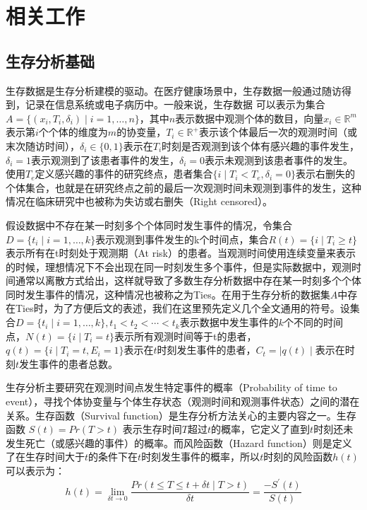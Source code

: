 \chapter{相关工作}

\section{生存分析基础}
生存数据是生存分析建模的驱动。在医疗健康场景中，生存数据一般通过随访得到，记录在信息系统或电子病历中。一般来说，生存数据 可以表示为集合$A=\{(x_i,T_i,\delta_i ) \mid i=1,\dots,n\}$，其中$n$表示数据中观测个体的数目，向量$x_i\in \mathbb{R}^m$表示第$i$个个体的维度为$m$的协变量，$T_i\in \mathbb{R}^+$表示该个体最后一次的观测时间（或末次随访时间），$\delta_i\in \{0,1\}$表示在$T_i$时刻是否观测到该个体有感兴趣的事件发生，$\delta_i=1$表示观测到了该患者事件的发生，$\delta_i=0$表示未观测到该患者事件的发生。使用$T_e$定义感兴趣的事件的研究终点，患者集合$\{i \mid T_i<T_e,\delta_i=0\}$表示右删失的个体集合，也就是在研究终点之前的最后一次观测时间未观测到事件的发生，这种情况在临床研究中也被称为失访或右删失（Right censored）。

假设数据中不存在某一时刻多个个体同时发生事件的情况，令集合$D=\{t_i \mid i=1,\dots,k\}$表示观测到事件发生的k个时间点，集合$R(t)=\{i \mid T_i\ge t\}$表示所有在t时刻处于观测期（At risk）的患者。当观测时间使用连续变量来表示的时候，理想情况下不会出现在同一时刻发生多个事件，但是实际数据中，观测时间通常以离散方式给出，这样就导致了多数生存分析数据中存在某一时刻多个个体同时发生事件的情况，这种情况也被称之为Ties。在用于生存分析的数据集$A$中存在Ties时，为了方便后文的表述，我们在这里预先定义几个全文通用的符号。设集合$D=\{t_i \mid i=1,\dots,k\},t_1<t_2<\cdots<t_k$表示数据中发生事件的$k$个不同的时间点，$N(t)=\{i \mid T_i=t\}$表示所有观测时间等于t的患者，$q(t)=\{i \mid T_i=t,E_i=1\}$表示在$t$时刻发生事件的患者，$C_t=\mid q(t) \mid$表示在时刻$t$发生事件的患者总数。

生存分析主要研究在观测时间点发生特定事件的概率（Probability of time to event），寻找个体协变量与个体生存状态（观测时间和观测事件状态）之间的潜在关系。生存函数（Survival function）是生存分析方法关心的主要内容之一。生存函数 $S(t)=Pr(T>t)$ 表示生存时间$T$超过$t$的概率，它定义了直到$t$时刻还未发生死亡（或感兴趣的事件）的概率。而风险函数（Hazard function）则是定义了在生存时间大于$t$的条件下在$t$时刻发生事件的概率，所以$t$时刻的风险函数$h(t)$可以表示为：
\begin{equation}
h(t)=\lim_{\delta t \rightarrow 0} \frac{Pr(t \le T\le t + \delta t \mid T>t)}{\delta t}
    =\frac{-S^{'}(t)}{S(t)} \label{F1}
\end{equation}

